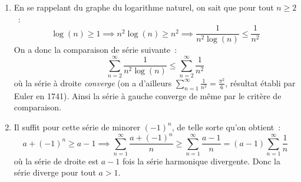 \documentclass{article}
\begin{document}
\begin{enumerate}
    \item En se rappelant du graphe du logarithme naturel, on sait que pour tout $n \geq 2$~:
    \[
    \log(n) \geq 1 \implies n^2\log(n) \geq n^2 \implies \frac{1}{n^2\log(n)} \leq \frac{1}{n^2}
    \]
    On a donc la comparaison de série suivante~:
    \[
    \sum_{n = 2}^{\infty} \frac{1}{n^2\log(n)} \leq \sum_{n = 2}^{\infty} \frac{1}{n^2}
    \]
    où la série à droite \emph{converge} (on a d'ailleurs $\displaystyle\sum_{n = 1}^{\infty} \frac{1}{n^2} = \frac{\pi^2}{6}$, résultat établi par Euler en 1741). Ainsi la série à gauche converge de même par le critère de comparaison.
    
    \item Il suffit pour cette série de minorer $(-1)^n$, de telle sorte qu'on obtient~:
    \[
    a + (-1)^n \geq a - 1 \implies \sum_{n = 1}^{\infty} \frac{a + (-1)^n}{n} \geq \sum_{n = 1}^{\infty} \frac{a - 1}{n} = (a - 1) \sum_{n = 1}^{\infty} \frac{1}{n}
    \]
    où la série de droite est $a - 1$ fois la série harmonique divergente. Donc la série diverge pour tout $a > 1$.
\end{enumerate}
\end{document}
